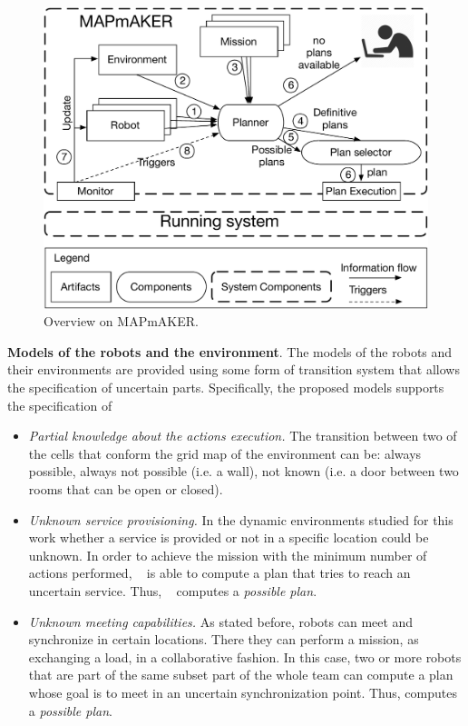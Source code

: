 \begin{figure}[t]
\begin{center}
\includegraphics[width=1\linewidth]{Figures/MAPmAKER.pdf}
\caption{Overview on  MAPmAKER.}
\label{fig:overview}
\end{center}
\end{figure}


\textbf{Models of the robots and the environment}. 
The models of the robots and their environments are provided using some form of transition system that allows the specification of uncertain parts.
Specifically, the proposed models supports the specification of
\begin{itemize}
\item  \emph{Partial knowledge about the actions execution.} 
The transition between two of the cells that conform the grid map of the environment can be:
always possible, always not possible (i.e. a wall), not known (i.e. a door between two rooms that can be open or closed).
\item \emph{Unknown service provisioning.} 
In the dynamic environments studied for this work whether a service is provided or not in a specific location could be unknown. 
In order to achieve the mission with the minimum number of actions performed, \toolName~ is able to compute a plan that tries to reach an uncertain service.
Thus, \toolName~ computes a \emph{possible plan}.
\item \emph{Unknown meeting capabilities.} 
As stated before, robots can meet and synchronize in certain locations.
There they can perform a mission, as exchanging a load, in a collaborative fashion.
In this case, two or more robots that are part of the same subset part of the whole team can compute a plan whose goal is to meet in an uncertain synchronization point.
Thus, \toolName computes a \emph{possible plan}.
\end{itemize}

